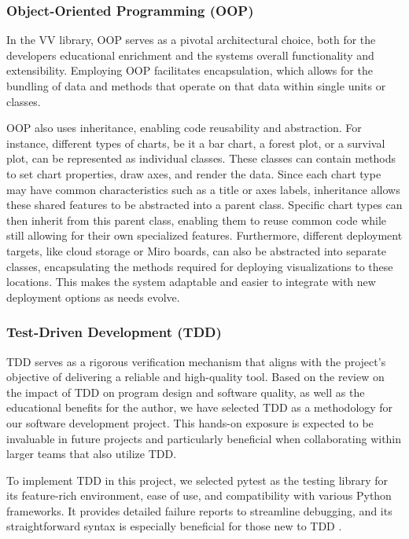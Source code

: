 \subsubsection{Object-Oriented Programming
(OOP)}\label{object-oriented-programming-oop}

In the VV library, OOP serves as a pivotal architectural choice, both
for the developer\textquotesingle s educational enrichment and the
system\textquotesingle s overall functionality and extensibility.
Employing OOP facilitates encapsulation, which allows for the bundling
of data and methods that operate on that data within single units or
classes.

OOP also uses inheritance, enabling code reusability and abstraction.
For instance, different types of charts, be it a bar chart, a forest
plot, or a survival plot, can be represented as individual classes.
These classes can contain methods to set chart properties, draw axes,
and render the data. Since each chart type may have common
characteristics such as a title or axes labels, inheritance allows these
shared features to be abstracted into a parent class. Specific chart
types can then inherit from this parent class, enabling them to reuse
common code while still allowing for their own specialized features.
Furthermore, different deployment targets, like cloud storage or Miro
boards, can also be abstracted into separate classes, encapsulating the
methods required for deploying visualizations to these locations. This
makes the system adaptable and easier to integrate with new deployment
options as needs evolve.

\subsubsection{Test-Driven Development
(TDD)}\label{test-driven-development-tdd}

TDD serves as a rigorous verification mechanism that aligns with the
project's objective of delivering a reliable and high-quality tool.
Based on the review on the impact of TDD on program design
and software quality, as well as the educational benefits for the
author, we have selected TDD as a methodology for our software
development project. This hands-on exposure is expected to be invaluable in future projects
and particularly beneficial when collaborating within larger teams that
also utilize TDD.

To implement TDD in this project, we selected pytest as the testing
library for its feature-rich environment, ease of use, and compatibility
with various Python frameworks. It provides detailed failure reports to
streamline debugging, and its straightforward syntax is especially
beneficial for those new to TDD
\cite{40}.

